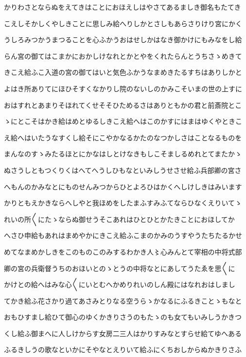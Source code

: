 \documentclass[a4paper,11pt,landscape]{ltjtarticle}
\begin{document}
かりわさとならぬをえてきはことにおほえしはやさてあるましき御名もたてき
\par\medskip
こえしそかしくやしきことに思しみ給へりしかとさしもあらさりけり宮にかく
\par\medskip
うしろみつかうまつることを心ふかうおはせしかはなき御かけにもみなをし給
\par\medskip
らん宮の御てはこまかにおかしけなれとかとやをくれたらんとうちさゝめきて
\par\medskip
きこえ給ふこ入道の宮の御てはいと気色ふかうなまめきたるすちはありしかと
\par\medskip
よはき所ありてにほひそすくなかりし院のないしのかみこそいまの世の上すに
\par\medskip
おはすれとあまりそほれてくせそそひためるさはありともかの君と前斎院とこ
\par\medskip
ゝにとこそはかき給はめとゆるしきこえ給へはこのかすにはまはゆくやときこ
\par\medskip
え給へはいたうなすくし給そにこやかなるかたのなつかしさはことなるものを
\par\medskip
まんなのすゝみたるほとにかなはしとけなきもしこそましるめれとてまたかゝ
\par\medskip
ぬさうしともつくりくはへてへうしひもなといみしうせさせ給ふ兵部卿の宮さ
\par\medskip
へもんのかみなとにものせんみつからひとよろひはかくへしけしきはみいます
\par\medskip
かりともえかきならへしやと我ほめをしたまふすみふてならひなくえりいてゝ
\par\medskip
れいの所〱にたゝならぬ御せうそこあれはひとひとかたきことにおほしてか
\par\medskip
へさひ申給もあれはまめやかにきこえ給ふこまのかみのうすやうたちたるかせ
\par\medskip
めてなまめかしきをこのものこのみするわかき人〻心みんとて宰相の中将式部
\par\medskip
卿の宮の兵衛督うちのおほいとのゝとうの中将なとにあしてうたゑを思〱に
\par\medskip
かけとの給へはみな心〱にいとむへかめりれいのしん殿にはなれおはしまし
\par\medskip
てかき給ふ花さかり過てあさみとりなる空うらゝかなるにふるきことゝもなと
\par\medskip
おもひすまし給ひて御心のゆくかきりさうのもたゝのも女てもいみしうかきつ
\par\medskip
くし給ふ御まへに人しけからす女房二三人はかりすみなとすらせ給てゆへある
\par\medskip
ふるきしうの歌なといかにそやなとえりいて給ふにくちおしからぬかきりさふ
\end{document}
